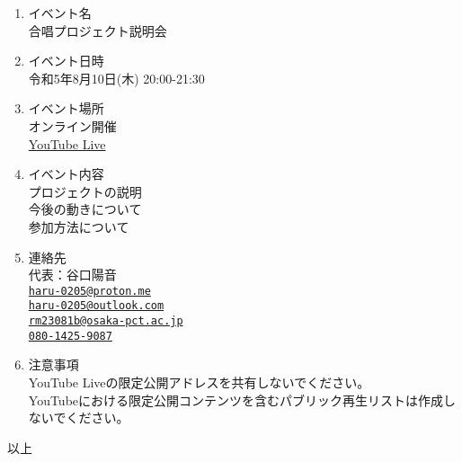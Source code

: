 \documentclass{jlreq}
\begin{document}
\begin{enumerate}
    \item イベント名\\
          合唱プロジェクト説明会
    \item イベント日時\\
          令和5年8月10日(木) 20:00-21:30
    \item イベント場所\\
          オンライン開催\\
          \href{https://youtube.com/live/JUqEJS81dz4?feature=share}{YouTube Live}\\
    \item イベント内容\\
          プロジェクトの説明\\
          今後の動きについて\\
          参加方法について
    \item 連絡先\\
          代表：谷口陽音\\
          \href{mailto:haru-0205@proton.me}{\nolinkurl{haru-0205@proton.me}}\\
          \href{mailto:haru-0205@outlook.com}{\nolinkurl{haru-0205@outlook.com}}\\
          \href{mailto:rm23081b@osaka-pct.ac.jp}{\nolinkurl{rm23081b@osaka-pct.ac.jp}}\\
          \href{sms:080-1425-9087}{\nolinkurl{080-1425-9087}}\\
    \item 注意事項\\
          YouTube Liveの限定公開アドレスを共有しないでください。\\
          YouTubeにおける限定公開コンテンツを含むパブリック再生リストは作成しないでください。\\

\end{enumerate}
\begin{flushright}
    以上
\end{flushright}
\end{document}
